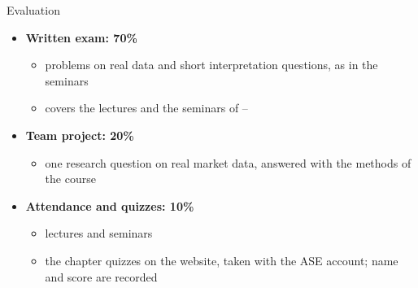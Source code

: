 \begin{frame}{Evaluation}
\itemsize{\small}
\begin{itemize}
    \item \textbf{Written exam: 70\%}
    \begin{itemize}
        \item problems on real data and short interpretation questions, as in the seminars
        \item covers the lectures and the seminars of --
    \end{itemize}
    \item \textbf{Team project: 20\%}
    \begin{itemize}
        \item one research question on real market data, answered with the methods of the course
    \end{itemize}
    \item \textbf{Attendance and quizzes: 10\%}
    \begin{itemize}
        \item lectures and seminars
        \item the chapter quizzes on the website, taken with the ASE account; name and score are recorded
    \end{itemize}
\end{itemize}
\end{frame}

